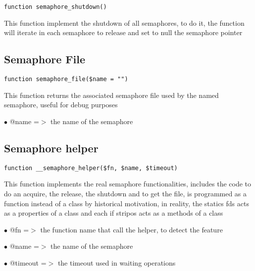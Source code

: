 \documentclass[a4paper]{book}
\begin{document}
\begin{lstlisting}
function semaphore_shutdown()
\end{lstlisting}

This function implement the shutdown of all semaphores, to do it,
the function will iterate in each semaphore to release and set to
null the semaphore pointer

\hypertarget{toc238}{}
\subsection{Semaphore File}

\begin{lstlisting}
function semaphore_file($name = "")
\end{lstlisting}

This function returns the associated semaphore file used by the
named semaphore, useful for debug purposes

\begin{compactitem}
\item[\color{myblue}$\bullet$] @name =$>$ the name of the semaphore
\end{compactitem}

\hypertarget{toc239}{}
\subsection{Semaphore helper}

\begin{lstlisting}
function __semaphore_helper($fn, $name, $timeout)
\end{lstlisting}

This function implements the real semaphore functionalities, includes
the code to do an acquire, the release, the shutdown and to get the
file, is programmed as a function instead of a class by historical
motivation, in reality, the statics fds acts as a properties of a
class and each if stripos acts as a methods of a class

\begin{compactitem}
\item[\color{myblue}$\bullet$] @fn      =$>$ the function name that call the helper, to detect the feature
\item[\color{myblue}$\bullet$] @name    =$>$ the name of the semaphore
\item[\color{myblue}$\bullet$] @timeout =$>$ the timeout used in waiting operations
\end{compactitem}
\end{document}
